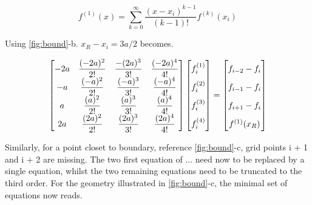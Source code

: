 \begin{equation} \label{eq:taylor}
f^{(1)}(x) = \sum\limits_{k=0}^{\infty} \dfrac{(x-x_i)^{k-1}}{(k - 1)!}f^{(k)}(x_i)
\end{equation}

Using \ref{fig:bound}-b. $x_R - x_i = 3a/2$ becomes.

\begin{align}
\begin{bmatrix} \label{eq:matrix4}
    -2a & \dfrac{(-2a)^2}{2!} & \dfrac{-(2a)^3}{3!} & \dfrac{(-2a)^4}{4!}\\
    -a & \dfrac{(-a)^2}{2!} & \dfrac{(-a)^3}{3!} & \dfrac{(-a)^4}{4!}\\
    a & \dfrac{(a)^2}{2!} & \dfrac{(a)^3}{3!} & \dfrac{(a)^4}{4!}\\
    2a & \dfrac{(2a)^2}{2!} & \dfrac{(2a)^3}{3!} & \dfrac{(2a)^4}{4!}
\end{bmatrix}
\begin{bmatrix}
    f_i^{(1)}  \vphantom{ \dfrac{d^4}{d} }\\
    f_i^{(2)}  \vphantom{ \dfrac{d^4}{d} } \\
    f_i^{(3)}  \vphantom{ \dfrac{d^4}{d} } \\
    f_i^{(4)}  \vphantom{ \dfrac{d^4}{d} }
\end{bmatrix}
=
\begin{bmatrix}
    f_{i-2} - f_{i}    \vphantom{ \dfrac{d^4}{d}} \\
    f_{i-1} - f_{i}    \vphantom{ \dfrac{d^4}{d}} \\
    f_{i+1} - f_{i}    \vphantom{ \dfrac{d^4}{d}} \\
    f^{(1)}(x_R)   \vphantom{ \dfrac{d^4}{d}}
\end{bmatrix}
\end{align}

Similarly, for a point closet to boundary, reference \ref{fig:bound}-c, grid points i + 1 and i + 2 are missing. The two first equation of ... need now to be replaced by a single equation, whilst the two remaining equations need to be truncated to the third order. For the geometry illustrated in \ref{fig:bound}-c, the minimal set of equations now reads.

